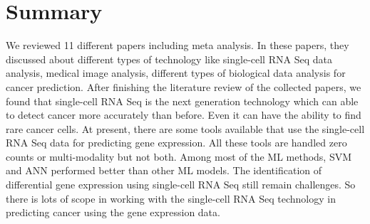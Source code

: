 \section{Summary}
\label{sum_back}
We reviewed 11 different papers including meta analysis. In these papers, they discussed about different types of technology like single-cell RNA Seq data analysis, medical image analysis, different types of biological data analysis for cancer prediction. After finishing the literature review of the collected papers, we found that single-cell RNA Seq is the next generation technology which can able to detect cancer more accurately than before. Even it can have the ability to find rare cancer cells. At present, there are some tools available that use the single-cell RNA Seq data for predicting gene expression. All these tools are handled zero counts or multi-modality but not both. Among most of the ML methods, SVM and ANN performed better than other ML models. The identification of differential gene expression using single-cell RNA Seq still remain challenges. So there is lots of scope in working with the single-cell RNA Seq technology in predicting cancer using the gene expression data.


